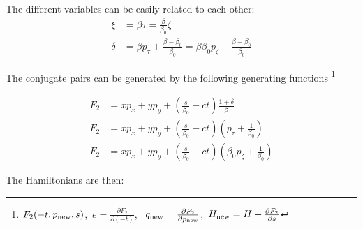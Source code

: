 
The different variables can be easily related to each other:
\begin{align}
  \xi    &=
      \beta\tau =
      \frac{\beta}{\beta_0}\zeta \\
  \delta &=
      \beta p_\tau + \frac{\beta-\beta_0}{\beta_0} =
      \beta\beta_0 p_\zeta + \frac{\beta-\beta_0}{\beta_0}
\end{align}

The conjugate pairs can be generated by the following generating functions \footnote{
$F_2(-t , p_{\rm new}, s)$,\,
$e = \frac{\partial F_2}{\partial (-t)}$, \,
$q_{\rm new} = \frac{\partial F_2}{\partial p_{\rm new}}$,\,
$H_{\rm new} = H + \frac{\partial F_2}{\partial s}$
}

\begin{align}
F_2& = x p_x + y p_y + \left(\frac{s}{\beta_0}-ct\right)
                            \frac{1+\delta}{\beta} \\
F_2& = x p_x + y p_y + \left(\frac{s}{\beta_0}-ct\right)
                            \left(p_\tau + \frac{1}{\beta_0}\right) \\
F_2& = x p_x + y p_y + \left(\frac{s}{\beta_0}-ct\right)
                            \left(\beta_0 p_\zeta + \frac{1}{\beta_0}\right)
\end{align}

The Hamiltonians are then:


